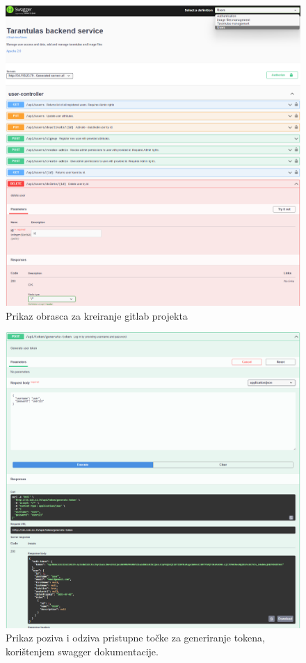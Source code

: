 \documentclass[a4paper,12pt,oneside]{article}
\begin{document}
\begin{figure}
    \centering
    \includegraphics[width=1\linewidth]{Slike/swagger-ui.png}
    \caption{Prikaz obrasca za kreiranje gitlab projekta}
    \label{fig:swagger-ui}
\end{figure}

\begin{figure}
    \centering
    \includegraphics[width=1\linewidth]{Slike/swagger-api-call.png}
    \caption{Prikaz poziva i odziva pristupne točke za generiranje tokena, korištenjem swagger dokumentacije.}
    \label{fig:swagger-api-call}
\end{figure}
\end{document}
